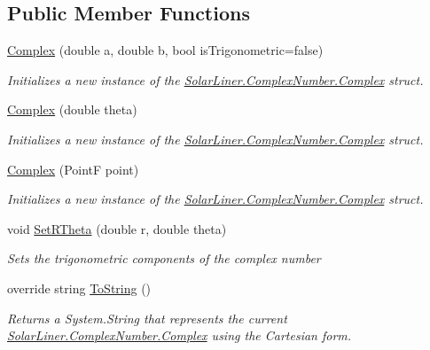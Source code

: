 \subsection*{Public Member Functions}
\begin{DoxyCompactItemize}
\item 
\hyperlink{struct_solar_liner_1_1_complex_number_1_1_complex_a6835a31687ea342cd7f9ae7d8a89521e}{Complex} (double a, double b, bool is\+Trigonometric=false)
\begin{DoxyCompactList}\small\item\em Initializes a new instance of the \hyperlink{struct_solar_liner_1_1_complex_number_1_1_complex}{Solar\+Liner.\+Complex\+Number.\+Complex} struct. \end{DoxyCompactList}\item 
\hyperlink{struct_solar_liner_1_1_complex_number_1_1_complex_a37396120a491752ddd448d539d45ecdf}{Complex} (double theta)
\begin{DoxyCompactList}\small\item\em Initializes a new instance of the \hyperlink{struct_solar_liner_1_1_complex_number_1_1_complex}{Solar\+Liner.\+Complex\+Number.\+Complex} struct. \end{DoxyCompactList}\item 
\hyperlink{struct_solar_liner_1_1_complex_number_1_1_complex_a543d3bb037a556218a36ad824a142cdd}{Complex} (PointF point)
\begin{DoxyCompactList}\small\item\em Initializes a new instance of the \hyperlink{struct_solar_liner_1_1_complex_number_1_1_complex}{Solar\+Liner.\+Complex\+Number.\+Complex} struct. \end{DoxyCompactList}\item 
void \hyperlink{struct_solar_liner_1_1_complex_number_1_1_complex_a6b015a8806a81034a8d38b02a94509ba}{Set\+R\+Theta} (double r, double theta)
\begin{DoxyCompactList}\small\item\em Sets the trigonometric components of the complex number \end{DoxyCompactList}\item 
override string \hyperlink{struct_solar_liner_1_1_complex_number_1_1_complex_a14ea2f3707b23006729eeac62484a556}{To\+String} ()
\begin{DoxyCompactList}\small\item\em Returns a System.\+String that represents the current \hyperlink{struct_solar_liner_1_1_complex_number_1_1_complex}{Solar\+Liner.\+Complex\+Number.\+Complex} using the Cartesian form. \end{DoxyCompactList}\item 

\end{DoxyCompactItemize}
